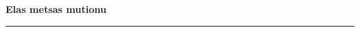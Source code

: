 \documentclass[10pt]{book}
\begin{document}
{
  \samepage
  \raggedbottom
  \raggedright
  \sloppy


  \vspace{0.2in}

  \noindent\begin{minipage}{.1\textwidth}
    \hfill\vspace{0.1in}
  \end{minipage}%
  \noindent\begin{minipage}{.8\textwidth}
    \centering
    \bfseries
    \large Elas metsas mutionu
  \end{minipage}%
  \noindent\begin{minipage}{.1\textwidth}
      \hfill\vspace{0.1in}
  \end{minipage}

  \nopagebreak[4]
  \vspace{0.1in}
  \nopagebreak[4]
  \hrule height 0.05ex
  \nopagebreak[4]
  \vspace{-0.05in}




}
\end{document}
